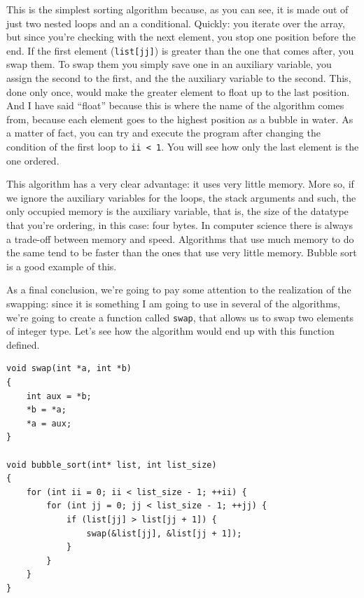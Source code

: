 \documentclass[a4paper]{article}
\begin{document}
This is the simplest sorting algorithm because, as you can see, it is made out
of just two nested loops and an a conditional. Quickly: you iterate over the
array, but since you're checking with the next element, you stop one position
before the end. If the first element (\verb!list[jj]!) is greater than the one
that comes after, you swap them. To swap them you simply save one in an
auxiliary variable, you assign the second to the first, and the the auxiliary
variable to the second. This, done only once, would make the greater element to
float up to the last position. And I have said ``float'' because this is where
the name of the algorithm comes from, because each element goes to the highest
position as a bubble in water. As a matter of fact, you can try and execute
the program after changing the condition of the first loop to \verb!ii < 1!.
You will see how only the last element is the one ordered.

This algorithm has a very clear advantage: it uses very little memory. More so,
if we ignore the auxiliary variables for the loops, the stack arguments and
such, the only occupied memory is the auxiliary variable, that is, the size
of the datatype that you're ordering, in this case: four bytes. In computer
science there is always a trade-off between memory and speed. Algorithms that
use much memory to do the same tend to be faster than the ones that use very
little memory. Bubble sort is a good example of this.

As a final conclusion, we're going to pay some attention to the realization of
the swapping: since it is something I am going to use in several of the
algorithms, we're going to create a function called \verb!swap!, that allows us
to swap two elements of integer type. Let's see how the algorithm would end up
with this function defined.

\noindent
\begin{minipage}[H]{\linewidth}
\mbox{}
\begin{lstlisting}[style=C,
caption={Implementation of \texttt{swap} and use in bubble sort},
label={lst:bubbleSwap}]
void swap(int *a, int *b)
{
    int aux = *b;
    *b = *a;
    *a = aux;
}

void bubble_sort(int* list, int list_size)
{
    for (int ii = 0; ii < list_size - 1; ++ii) {
        for (int jj = 0; jj < list_size - 1; ++jj) {
            if (list[jj] > list[jj + 1]) {
                swap(&list[jj], &list[jj + 1]);
            }
        }
    }
}
\end{lstlisting}
\end{minipage}
\end{document}
